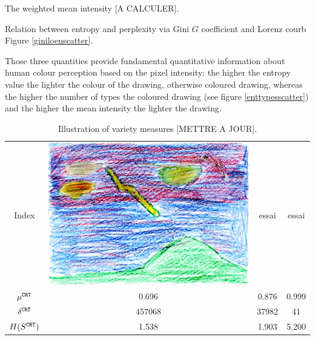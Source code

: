 \documentclass[11pt,a4paper]{article}
\begin{document}
The weighted mean intensity {[}A CALCULER{]}.

Relation between entropy and perplexity via Gini \(G\) coefficient and
Lorenz courb Figure \ref{giniloenscatter}.

Those three quantities provide fundamental quantitative information
about human colour perception based on the pixel intensity: the higher
the entropy value the lighter the colour of the drawing, otherwise
coloured drawing, whereas the higher the number of types the coloured
drawing (see figure \ref{enttypesscatter}) and the higher the mean
intensity the lighter the drawing.




\begin{table}
\begin{tabular}[]{cccc}

\small Index &
\includegraphics[height=0.06\textwidth]{figures/ru09_sp_m_rf_14_03_ale-r.jpg}
& essai & essai \\


\small \(\mu^{\tt \scriptstyle CRT}\) & \small 0.696 & \small 0.876 &
\small 0.999\tabularnewline
\small \(\delta^{\tt \scriptstyle CRT}\) & \small 457068 & \small 37982
& \small 41\tabularnewline
\small \(H(S^{\tt \scriptstyle CRT})\) & \small 1.538 & \small 1.903 &
\small 5.200\tabularnewline

\end{tabular}
\caption{Illustration of variety measures {[}METTRE A JOUR{]}. }
\label{varietyill}
\end{table}
\end{document}
